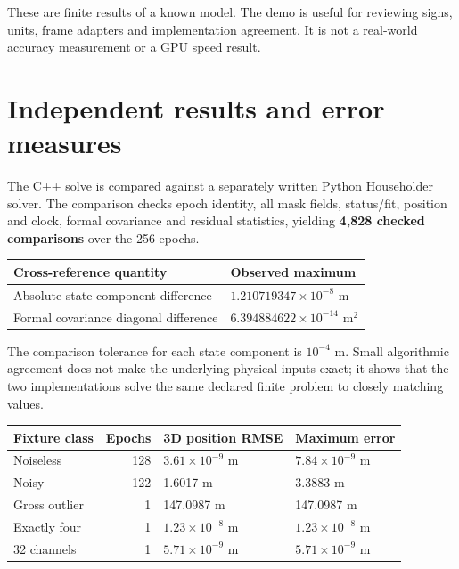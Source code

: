 \documentclass[11pt,a4paper]{article}
\begin{document}
These are finite results of a known model. The demo is useful for reviewing signs,
units, frame adapters and implementation agreement. It is not a real-world accuracy
measurement or a GPU speed result.
\clearpage

\section{Independent results and error measures}
The C++ solve is compared against a separately written Python Householder solver.
The comparison checks epoch identity, all mask fields, status/fit, position and clock,
formal covariance and residual statistics, yielding \textbf{4,828 checked comparisons}
over the 256 epochs.

\begin{center}
\begin{tabularx}{\textwidth}{@{}P{.54\textwidth}Y@{}}\toprule
\textbf{Cross-reference quantity} & \textbf{Observed maximum}\\\midrule
Absolute state-component difference & $1.210719347\times10^{-8}$ m\\
Formal covariance diagonal difference & $6.394884622\times10^{-14}$ m$^2$\\\bottomrule
\end{tabularx}
\end{center}

The comparison tolerance for each state component is $10^{-4}$ m. Small algorithmic
agreement does not make the underlying physical inputs exact; it shows that the two
implementations solve the same declared finite problem to closely matching values.

\begin{center}
\begin{tabularx}{\textwidth}{@{}P{.31\textwidth}rYY@{}}\toprule
\textbf{Fixture class} & \textbf{Epochs} & \textbf{3D position RMSE} & \textbf{Maximum error}\\\midrule
Noiseless &128&$3.61\times10^{-9}$ m&$7.84\times10^{-9}$ m\\
Noisy &122&1.6017 m&3.3883 m\\
Gross outlier &1&147.0987 m&147.0987 m\\
Exactly four &1&$1.23\times10^{-8}$ m&$1.23\times10^{-8}$ m\\
32 channels &1&$5.71\times10^{-9}$ m&$5.71\times10^{-9}$ m\\\bottomrule
\end{tabularx}
\end{center}
\end{document}
